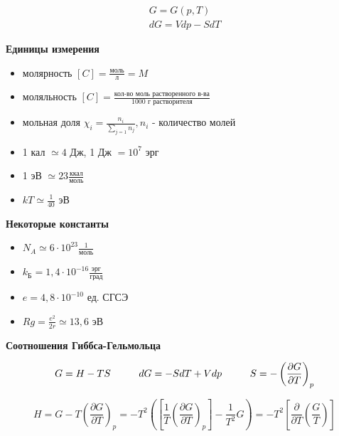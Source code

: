 \begin{lecture}
	\begin{align}
		G = G(p,T) \\
		dG = Vdp - SdT
	\end{align}
	
	\begin{center}
		\textbf{Единицы измерения}\\
	\end{center}

	\begin{itemize}
		\item молярность $[C] = \frac{\text{моль}}{\text{л}} = M$
		\item моляльность $[C] = \frac{\text{кол-во моль растворенного в-ва}}{\text{1000 г растворителя}}$
		\item мольная доля $\chi_i = \frac{n_i}{\sum\limits_{j=1} n_j}, n_i $ - количество молей
		\item 1 кал $\simeq 4$ Дж, 1 Дж $= 10^7$ эрг
		\item 1 эВ $\simeq 23 \frac{\text{ккал}}{\text{моль}}$
		\item $kT \simeq \frac{1}{40}$ эВ
	\end{itemize}

	\begin{center}
	\textbf{Некоторые константы}\\
	\end{center}

		\begin{itemize}
		\item $N_A \simeq 6 \cdot 10^{23} \frac{1}{\text{моль}}$
		\item $k_{\text{Б}} = 1,4 \cdot 10^{-16} \frac{\text{эрг}}{\text{град}}$
		\item $e = 4,8 \cdot 10^{-10}$ ед. СГСЭ
		\item $Rg = \frac{e^2}{2r} \simeq 13,6$ эВ
		\end{itemize}
	
	\begin{center}
		\textbf{Соотношения Гиббса-Гельмольца}\\
	\end{center}
	
	\begin{equation}	
	\begin{aligned}
	G = H - TS \hspace*{1cm} dG = -SdT + Vdp \hspace*{1cm} S = - \left( \dfrac{\partial G}{\partial T} \right)_{p}
	\end{aligned}
	\end{equation}
	
	\begin{equation}
	H = G - T\left( \dfrac{\partial G}{\partial T} \right)_{p} = -T^2 \left(\left[\frac{1}{T}\left( \dfrac{\partial G}{\partial T} \right)_{p}\right] - \frac{1}{T^2}G\right) = -T^2 \left[\dfrac{\partial}{\partial T}\left(\frac{G}{T}\right)\right]
	\end{equation}
	

\end{lecture}
